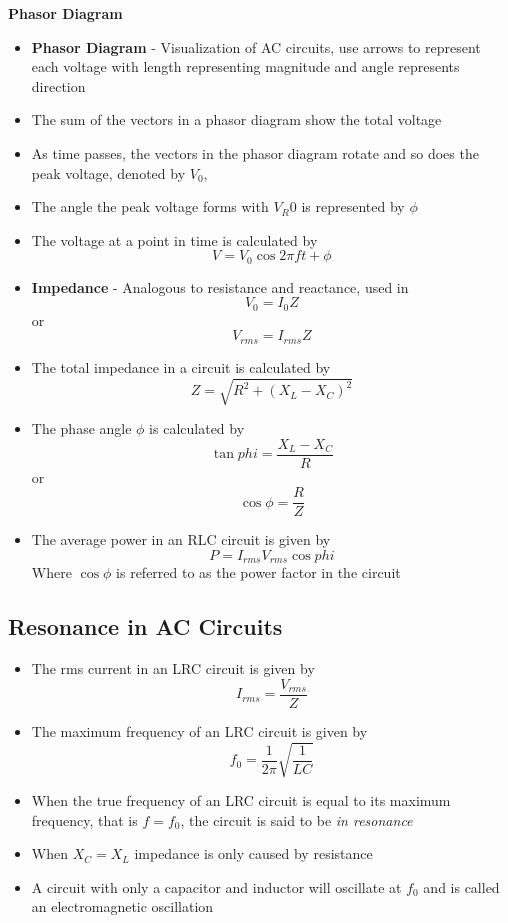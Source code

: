 \textbf{Phasor Diagram}
\begin{itemize}
    \item \textbf{Phasor Diagram} - Visualization of AC circuits, use arrows to represent each voltage with length representing magnitude and angle represents direction
    \item The sum of the vectors in a phasor diagram show the total voltage
    \item As time passes, the vectors in the phasor diagram rotate and so does the peak voltage, denoted by \(V_0\), 
    \item The angle the peak voltage forms with \(V_R0\) is represented by \(\phi\)
    \item The voltage at a point in time is calculated by \[V=V_0\cos{2\pi ft+\phi}\]
    \item \textbf{Impedance} - Analogous to resistance and reactance, used in \[V_0=I_0Z\] or \[V_{rms}=I_{rms}Z\]
    \item The total impedance in a circuit is calculated by \[Z=\sqrt{R^2+(X_L-X_C)^2}\]
    \item The phase angle \(\phi\) is calculated by \[\tan{phi}=\frac{X_L-X_C}{R}\] or \[\cos{\phi}=\frac{R}{Z}\]
    \item The average power in an RLC circuit is given by \[P=I_{rms}V_{rms}\cos{phi}\] Where \(\cos{\phi}\) is referred to as the power factor in the circuit
\end{itemize}

\subsection{Resonance in AC Circuits}
\begin{itemize}
    \item The rms current in an LRC circuit is given by \[I_{rms}=\frac{V_{rms}}{Z}\] 
    \item The maximum frequency of an LRC circuit is given by \[f_0=\frac{1}{2\pi}\sqrt{\frac{1}{LC}}\]
    \item When the true frequency of an LRC circuit is equal to its maximum frequency, that is \(f=f_0\), the circuit is said to be \emph{in resonance}
    \item When \(X_C=X_L\) impedance is only caused by resistance
    \item A circuit with only a capacitor and inductor will oscillate at \(f_0\) and is called an electromagnetic oscillation
\end{itemize}

\newpage